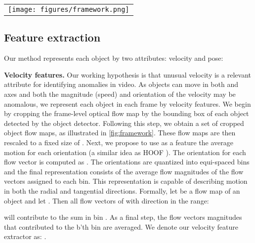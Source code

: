\documentclass[10pt,twocolumn,letterpaper]{article}
\begin{document}
\begin{figure*}[t]
  \centering
    \begin{tabular}{c}
    \texttt{[image: figures/framework.png]} 
    \end{tabular}
    \caption{An overview of our proposed method for extracting explicit attribute-based representations, along with implicit, deep representations. As a first step, we extract optical flow maps and bounding boxes for all of the objects in the frame. We then crop each object from the original image and its corresponding optical flow map. Our representation consists of velocity, pose, and deep (CLIP) features.}
    \label{fig:framework}
\end{figure*}


\subsection{Feature extraction}
\label{met:features}
Our method represents each object by two attributes: velocity and pose:

\textbf{Velocity features.} Our working hypothesis is that unusual velocity is a relevant attribute for identifying anomalies in video. As objects can move in both  and  axes and both the magnitude (speed) and orientation of the velocity may be anomalous, we represent each object in each frame by velocity features. We begin by cropping the frame-level optical flow map by the bounding box of each object detected by the object detector. Following this step, we obtain a set of cropped object flow maps, as illustrated in \cref{fig:framework}. These flow maps are then rescaled to a fixed size of . Next, we propose to use as a feature the average motion for each orientation (a similar idea as HOOF \cite{hoof3}). The orientation for each flow vector is computed as . The orientations are quantized into  equi-spaced bins and the final representation consists of the average flow magnitudes of the flow vectors assigned to each bin. This representation is capable of describing motion in both the radial and tangential directions. Formally, let  be a flow map of an object and let . Then all flow vectors  of  with direction  in the range:

will contribute  to the sum in bin . As a final step, the flow vectors magnitudes that contributed to the b'th bin are averaged. We denote our velocity feature extractor as: .
\end{document}
